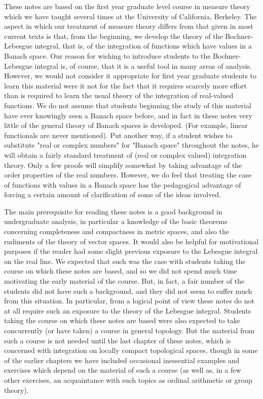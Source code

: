 These notes are based on the first year graduate level course in measure theory which we have taught several times at the University of California, Berkeley. The aspect in which our treatment of measure theory differs from that given in most current texts is that, from the beginning, we develop the theory of the Bochner-Lebesgue integral, that is, of the integration of functions which have values in a Banach space. Our reason for wishing to introduce students to the Bochner-Lebesgue integral is, of course, that it is a useful tool in many areas of analysis. However, we would not consider it appropriate for first year graduate students to learn this material were it not for the fact that it requires scarcely more effort than is required to learn the usual theory of the integration of real-valued functions. We do not assume that students beginning the study of this material have ever knowingly seen a Banach space before, and in fact in these notes very little of the general theory of Banach spaces is developed. (For example, linear functionals are never mentioned). Put another way, if a student wishes to substitute "real or complex numbers" for "Banach space" throughout the notes, he will obtain a fairly standard treatment of (real or complex valued) integration theory. Only a few proofs will simplify somewhat by taking advantage of the order properties of the real numbers. However, we do feel that treating the case of functions with values in a Banach space has the pedagogical advantage of forcing a certain amount of clarification of some of the ideas involved.

The main prerequisite for reading these notes is a good background in undergraduate analysis, in particular a knowledge of the basic theorems concerning completeness and compactness in metric spaces, and also the rudiments of the theory of vector spaces.  It would also be helpful for motivational purposes if the reader had some slight previous exposure to the Lebesgue integral on the real line.  We expected that such was the case with students taking the course on which these notes are based, and so we did not spend much time motivating the early material of the course. But, in fact, a fair number of the students did not have such a background, and they did not seem to suffer much from this situation. In particular, from a logical point of view these notes do not at all require such an exposure to the theory of the Lebesgue integral.  Students taking the course on which these notes are based were also expected to take concurrently (or have taken) a course in general topology.  But the material from such a course is not needed until the last chapter of these notes, which is concerned with integration on locally compact topological spaces, though in some of the earlier chapters we have included occasional inessential examples and exercises which depend on the material of such a course (as well as, in a few other exercises, an acquaintance with such topics as ordinal arithmetic or group theory).

